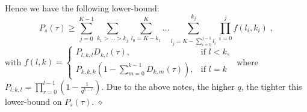 \documentclass[10pt,twocolumn,conference,final]{IEEEtran}
\def\endpf{\hfill$\diamond$}
\begin{document}
Hence we have the following lower-bound:
\[P_s(\tau)\geq \sum_{j=0}^{K-1}\sum_{k_1>\dots>k_j}\sum_{l_0=K-k_1}^{K}\dots\sum_{l_{j}=K-\sum_{i=0}^{j-1} l_i}^{k_j}\prod_{i=0}^j f(l_i,k_i)\;,\]
with
$f(l,k)=\left\{
\begin{array}{ll}
P_{l,k,l} D_{k,l}(\tau) ,&\mbox{if } l<k,\\
P_{k,k,k}\left(1-\sum_{m=0}^{k-1}D_{k,m}(\tau)\right),&\mbox{if } l=k
\end{array}
\right.$
where $P_{l,k,l}=\prod_{r=0}^{l-1}\left(1-\frac{1}{q^{k-r}}\right)$.
Due to the above notes, the higher $q$, the tighter this lower-bound on $P_s(\tau)$.
\endpf
\end{document}
